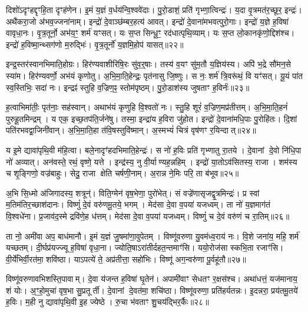 दिशो॑\-ऽदृꣳहद्दृꣳहि॒ता दृꣳह॑णेन।
इ॒मं य॒ज्ञं व॒र्धय॑न्वि॒श्ववे॑दाः।
पु॒रो॒डाशं॒ प्रति॑ गृभ्णा॒त्विन्द्रः॑।
य॒दा वृ॒त्रमत॑र॒च्छूर॒ इन्द्रः॑।
अथै॑करा॒जो अ॑भव॒ज्जना॑नाम्।
इन्द्रो॑ दे॒वाञ्छ॑म्बर॒हत्य॑ आवत्।
इन्द्रो॑ दे॒वाना॑मभवत्पुरो॒गाः।
इन्द्रो॑ य॒ज्ञे ह॒विषा॑ वावृधा॒नः।
वृ॒त्र॒तूर्नो॒ अभ॑य॒ꣳ॒ शर्म॑ यꣳसत्।
यः स॒प्त सिन्धू॒ꣳ॒ रद॑धात्पृथि॒व्याम्।
यः स॒प्त लो॒कानकृ॑णो॒द्दिश॑श्च।
इन्द्रो॑ ह॒विष्मा॒न्थ्सग॑णो म॒रुद्भिः॑।
वृ॒त्र॒तूर्नो॑ य॒ज्ञमि॒होप॑ यासत्॥२२॥\anuvakamend[व॒व॒र्थ॒ वि॒थ्स॒ इन्द्र॑स्तु॒रायास्तु वृत्र॒तूर्ये॒ वज्र॑बाहुः पृथि॒व्यान्त्रीणि॑ च]

इन्द्र॒स्तर॑स्वानभिमाति॒होग्रः।
हिर॑ण्यवाशीरिषि॒रः सु॑व॒र्॒षाः।
तस्य॑ व॒यꣳ सु॑म॒तौ य॒ज्ञिय॑स्य।
अपि॑ भ॒द्रे सौ॑मन॒से स्या॑म।
हिर॑ण्यवर्णो॒ अभ॑यं कृणोतु।
अ॒भि॒मा॒ति॒हेन्द्रः॒ पृत॑नासु जि॒ष्णुः।
स नः॒ शर्म॑ त्रि॒वरू॑थं॒ वि यꣳ॑सत्।
यू॒यं पा॑त स्व॒स्तिभिः॒ सदा॑ नः।
इन्द्रꣴ॑ स्तुहि व॒ज्रिण॒ꣴ॒ स्तोम॑पृष्ठम्।
पु॒रो॒डाश॑स्य जुषताꣳ ह॒विर्नः॑॥२३॥

ह॒त्वाभिमा॑तीः॒ पृत॑नाः॒ सह॑स्वान्।
अथाभ॑यं कृणुहि वि॒श्वतो॑ नः।
स्तु॒हि शूरं॑ व॒ज्रिण॒मप्र॑तीत्तम्।
अ॒भि॒मा॒ति॒हनं॑ पुरुहू॒तमिन्द्रम्।
य एक॒ इच्छ॒तप॑ति॒र्जने॑षु।
तस्मा॒ इन्द्रा॑य ह॒विरा जु॑होत।
इन्द्रो॑ दे॒वाना॑मधि॒पाः पु॒रोहि॑तः।
दि॒शां पति॑रभवद्वा॒जिनी॑वान्।
अ॒भि॒मा॒ति॒हा त॑वि॒षस्तुवि॑ष्मान्।
अ॒स्मभ्यं॑ चित्रं वृष॑णꣳ र॒यिन्दात्॥२४॥

य इ॒मे द्यावा॑पृथि॒वी म॑हि॒त्वा।
बले॒नादृꣳ॑हदभिमाति॒हेन्द्रः॑।
स नो॑ ह॒विः प्रति॑ गृभ्णातु रा॒तये।
दे॒वानां दे॒वो नि॑धि॒पा नो॑ अव्यात्।
अन॑वस्ते॒ रथं॒ वृष्णे॒ यत्ते।
इन्द्र॑स्य॒ नु वी॒र्याण्यह॒न्नहिम्।
इन्द्रो॑ या॒तो\-ऽव॑सितस्य॒ राजा।
शम॑स्य च शृ॒ङ्गिणो॒ वज्र॑बाहुः।
सेदु॒ राजा क्षेति चर्\mbox{}षणी॒नाम्।
अ॒रान्न ने॒मिः परि॒ ता ब॑भूव॥२५॥

अ॒भि सि॒ध्मो अ॑जिगादस्य॒ शत्रून्॑।
विति॒ग्मेन॑ वृष॒भेणा॒ पुरो॑भेत्।
सं वज्रे॑णासृजद्वृ॒त्रमिन्द्रः॑।
प्र स्वां म॒तिम॑तिर॒च्छाश॑दानः।
विष्णुं॑ दे॒वं वरु॑णमू॒तये॒ भगम्।
मेद॑सा दे॒वा व॒पया॑ यजध्वम्।
ता नो॑ य॒ज्ञमाग॑तं वि॒श्वधे॑ना।
प्र॒जाव॑द॒स्मे द्रवि॑णे॒ह ध॑त्तम्।
मेद॑सा दे॒वा व॒पया॑ यजध्वम्।
विष्णुं॑ च दे॒वं वरु॑णं च रा॒तिम्॥२६॥

ता नो॒ अमी॑वा अप॒ बाध॑मानौ।
इ॒मं य॒ज्ञं जु॒षमा॑णा॒वुपेतम्।
विष्णू॑वरुणा यु॒वम॑ध्व॒राय॑ नः।
वि॒शे जना॑य॒ महि॒ शर्म॑ यच्छतम्।
दी॒र्घप्र॑यज्ज्यू ह॒विषा॑ वृधा॒ना।
ज्योति॒षा\-ऽरा॑तीर्दह\-त॒न्तमाꣳ॑सि।
ययो॒रोज॑सा स्कभि॒ता रजाꣳ॑सि।
वी॒र्ये॑भिर्वी॒रत॑मा॒ शवि॑ष्ठा।
याऽपत्ये॑ ते॒ अप्र॑तीत्ता॒ सहो॑भिः।
विष्णू॑ अग॒न्वरु॑णा पू॒र्वहू॑तौ॥२७॥

विष्णू॑वरुणावभिशस्ति॒पावाम्।
दे॒वा य॑जन्त ह॒विषा॑ घृ॒तेन॑।
अपामी॑वाꣳ सेधतꣳ र॒क्षस॑श्च।
अथा॑धत्तं॒ यज॑मानाय॒ शं योः।
अ॒ꣳ॒हो॒मुचा॑ वृष॒भा सु॒प्रतूर्ती।
दे॒वानां दे॒वत॑मा॒ शचि॑ष्ठा।
विष्णू॑वरुणा॒ प्रति॑हर्यतन्नः।
इ॒दन्नरा॒ प्रय॑तमू॒तये॑ ह॒विः।
म॒ही नु द्यावा॑पृथि॒वी इ॒ह ज्येष्ठे।
रु॒चा भ॑वताꣳ शु॒चय॑द्भिर॒र्कैः॥२८॥

